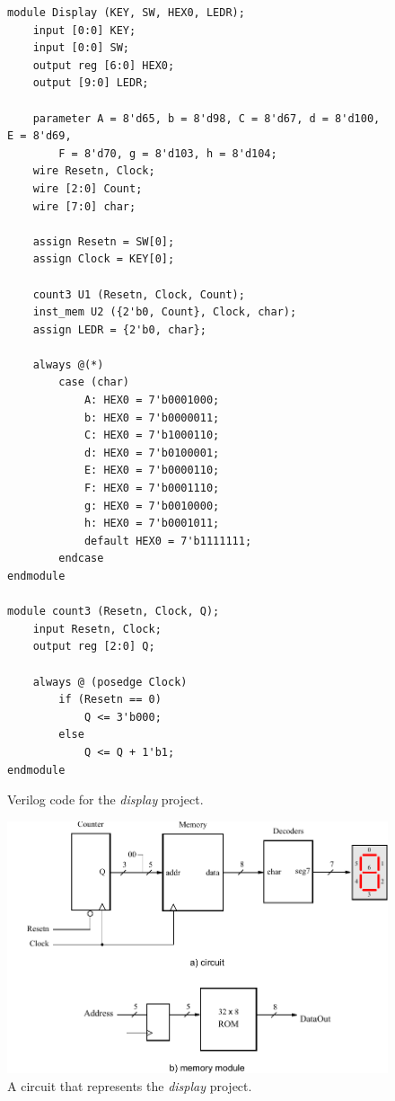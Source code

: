 \documentclass[epsfig,10pt,fullpage]{article} \addtolength{\textwidth}{1.5in}
\begin{document}
\lstset{language=Verilog,numbers=none,escapechar=?}
\begin{figure}[h!]
\begin{center}
\begin{minipage}[t]{15 cm}
\begin{lstlisting}[name=display]
module Display (KEY, SW, HEX0, LEDR);
    input [0:0] KEY;
    input [0:0] SW;
    output reg [6:0] HEX0;
    output [9:0] LEDR;	

    parameter A = 8'd65, b = 8'd98, C = 8'd67, d = 8'd100, E = 8'd69, 
        F = 8'd70, g = 8'd103, h = 8'd104;
    wire Resetn, Clock;
    wire [2:0] Count;
    wire [7:0] char;

    assign Resetn = SW[0];
    assign Clock = KEY[0];

    count3 U1 (Resetn, Clock, Count);
    inst_mem U2 ({2'b0, Count}, Clock, char);
    assign LEDR = {2'b0, char};

    always @(*)
        case (char)
            A: HEX0 = 7'b0001000;
            b: HEX0 = 7'b0000011;
            C: HEX0 = 7'b1000110;
            d: HEX0 = 7'b0100001;
            E: HEX0 = 7'b0000110;
            F: HEX0 = 7'b0001110;
            g: HEX0 = 7'b0010000;
            h: HEX0 = 7'b0001011;
            default HEX0 = 7'b1111111;
        endcase
endmodule

module count3 (Resetn, Clock, Q);
    input Resetn, Clock;
    output reg [2:0] Q;

    always @ (posedge Clock)
        if (Resetn == 0)
            Q <= 3'b000;
        else
            Q <= Q + 1'b1;
endmodule
\end{lstlisting}
\end{minipage}
        \caption{Verilog code for the {\it display} project.}
\label{fig:display}
\end{center}
\end{figure}

\begin{figure}[t]
	\begin{center}
		\includegraphics[scale = 1.0]{figures/figdisplay.pdf}
	\end{center}
          \caption{A circuit that represents the {\it display} project.}
	\label{fig:memory}
\end{figure}
\end{document}
